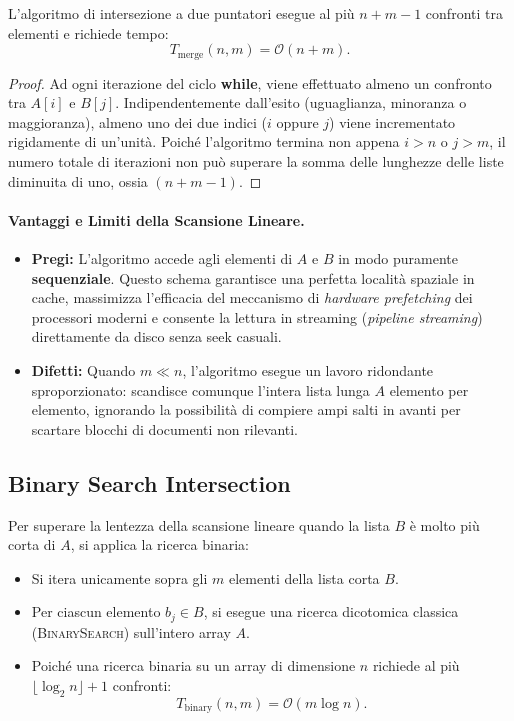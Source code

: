 \begin{theorem}
L'algoritmo di intersezione a due puntatori esegue al più $n + m - 1$ confronti tra elementi e richiede tempo:
\begin{equation}
  T_{\text{merge}}(n, m) = \mathcal{O}(n + m).
\end{equation}
\end{theorem}
\begin{proof}
Ad ogni iterazione del ciclo \textbf{while}, viene effettuato almeno un confronto tra $A[i]$ e $B[j]$. Indipendentemente dall'esito (uguaglianza, minoranza o maggioranza), almeno uno dei due indici ($i$ oppure $j$) viene incrementato rigidamente di un'unità. Poiché l'algoritmo termina non appena $i > n$ o $j > m$, il numero totale di iterazioni non può superare la somma delle lunghezze delle liste diminuita di uno, ossia $(n + m - 1)$.
\end{proof}

\paragraph{Vantaggi e Limiti della Scansione Lineare.}
\begin{itemize}
  \item \textbf{Pregi:} L'algoritmo accede agli elementi di $A$ e $B$ in modo puramente \textbf{sequenziale}. Questo schema garantisce una perfetta località spaziale in cache, massimizza l'efficacia del meccanismo di \textit{hardware prefetching} dei processori moderni e consente la lettura in streaming (\textit{pipeline streaming}) direttamente da disco senza seek casuali.
  \item \textbf{Difetti:} Quando $m \ll n$, l'algoritmo esegue un lavoro ridondante sproporzionato: scandisce comunque l'intera lista lunga $A$ elemento per elemento, ignorando la possibilità di compiere ampi salti in avanti per scartare blocchi di documenti non rilevanti.
\end{itemize}

\FloatBarrier
\subsection{Binary Search Intersection}
Per superare la lentezza della scansione lineare quando la lista $B$ è molto più corta di $A$, si applica la ricerca binaria:
\begin{itemize}
  \item Si itera unicamente sopra gli $m$ elementi della lista corta $B$.
  \item Per ciascun elemento $b_j \in B$, si esegue una ricerca dicotomica classica (\textsc{BinarySearch}) sull'intero array $A$.
  \item Poiché una ricerca binaria su un array di dimensione $n$ richiede al più $\lfloor \log_2 n \rfloor + 1$ confronti:
  \begin{equation}
    T_{\text{binary}}(n, m) = \mathcal{O}(m \log n).
  \end{equation}
\end{itemize}

